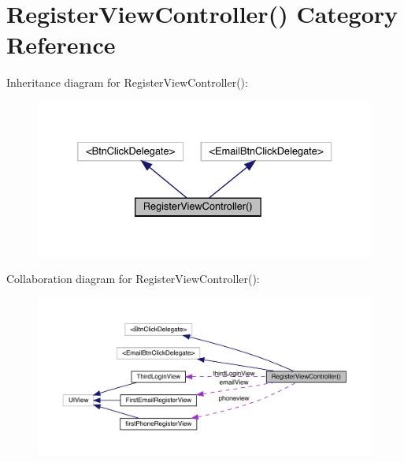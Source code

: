 \hypertarget{category_register_view_controller_07_08}{}\section{Register\+View\+Controller() Category Reference}
\label{category_register_view_controller_07_08}


Inheritance diagram for Register\+View\+Controller()\+:\nopagebreak
\begin{figure}[H]
\begin{center}
\leavevmode
\includegraphics[width=332pt]{category_register_view_controller_07_08__inherit__graph}
\end{center}
\end{figure}


Collaboration diagram for Register\+View\+Controller()\+:\nopagebreak
\begin{figure}[H]
\begin{center}
\leavevmode
\includegraphics[width=350pt]{category_register_view_controller_07_08__coll__graph}
\end{center}
\end{figure}
